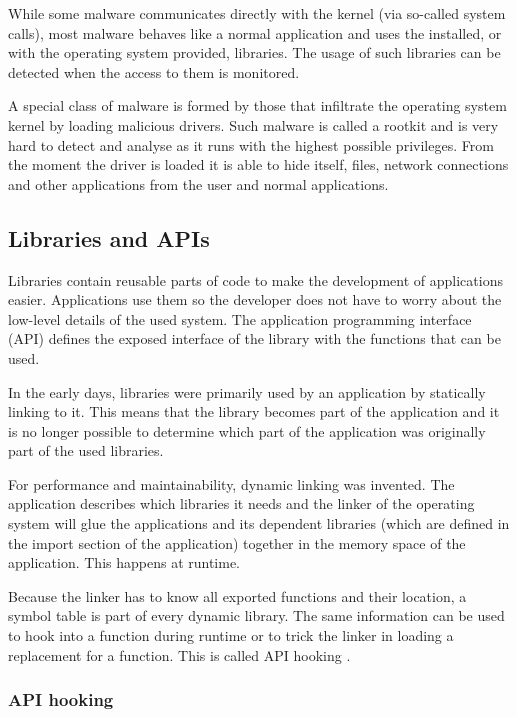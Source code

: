 While some malware communicates directly with the kernel (via so-called system calls), most malware \cite{MaliciousAPIs} behaves like a normal application and uses the installed, or with the operating system provided, libraries. The usage of such libraries can be detected when the access to them is monitored.

A special class of malware \cite{ZeroAccess,Gameover} is formed by those that infiltrate the operating system kernel by loading malicious drivers. Such malware is called a rootkit and is very hard to detect and analyse as it runs with the highest possible privileges. From the moment the driver is loaded it is able to hide itself, files, network connections and other applications from the user and normal applications.

\subsection{Libraries and APIs}

Libraries contain reusable parts of code to make the development of applications easier. Applications use them so the developer does not have to worry about the low-level details of the used system. The application programming interface (API) defines the exposed interface of the library with the functions that can be used.

In the early days, libraries were primarily used by an application by statically linking to it. This means that the library becomes part of the application and it is no longer possible to determine which part of the application was originally part of the used libraries.

For performance and maintainability, dynamic linking was invented. The application describes which libraries it needs and the linker of the operating system will glue the applications and its dependent libraries (which are defined in the import section of the application) together in the memory space of the application. This happens at runtime. 

Because the linker has to know all exported functions and their location, a symbol table is part of every dynamic library. The same information can be used to hook into a function during runtime or to trick the linker in loading a replacement for a function. This is called API hooking \cite{APIHookingRevealed}.

\subsubsection{API hooking}

